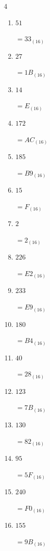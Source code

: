 \begin{multicols}{4}
\begin{enumerate}
        $=E_{(16)}$

  \item $51$

        $=33_{(16)}$

  \item $27$

        $=1B_{(16)}$

  \item $14$

        $=E_{(16)}$

  \item $172$

        $=AC_{(16)}$

  \item $185$

        $=B9_{(16)}$

  \item $15$

        $=F_{(16)}$

  \item $2$

        $=2_{(16)}$

  \item $226$

        $=E2_{(16)}$

  \item $233$

        $=E9_{(16)}$

  \item $180$

        $=B4_{(16)}$

  \item $40$

        $=28_{(16)}$

\columnbreak %

  \item $123$

        $=7B_{(16)}$

  \item $130$

        $=82_{(16)}$

  \item $95$

        $=5F_{(16)}$

  \item $240$

        $=F0_{(16)}$

  \item $155$

        $=9B_{(16)}$


\end{enumerate}
\end{multicols}
